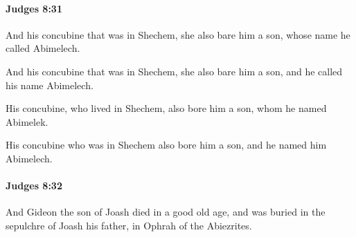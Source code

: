 		\paragraph{Judges 8:31} %
			\label{JUDGES-8-31}

			And his concubine that was in Shechem, she also bare him a son, whose name he called Abimelech.

			\begin{versebox}
					\item[BHS] 
					\item[ASV] And his concubine that was in Shechem, she also bare him a son, and he called his name Abimelech.
					\item[NIV] His concubine, who lived in Shechem, also bore him a son, whom he named Abimelek.
					\item[NRSV] His concubine who was in Shechem also bore him a son, and he named him Abimelech.
			\end{versebox}

		\paragraph{Judges 8:32} %
			\label{JUDGES-8-32}

			And Gideon the son of Joash died in a good old age, and was buried in the sepulchre of Joash his father, in Ophrah of the Abiezrites.

